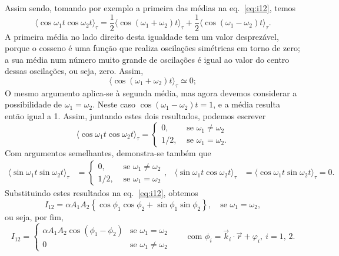 Assim sendo, tomando por exemplo a primeira das médias na eq.~\eqref{eq:i12},
temos
\begin{equation*}
\langle\cos\omega_1t\cos\omega_2t\rangle_\tau=
\frac{1}{2}\langle\cos(\omega_1+\omega_2)t\rangle_\tau+
\frac{1}{2}\langle\cos(\omega_1-\omega_2)t\rangle_\tau.
\end{equation*}
A primeira média no lado direito desta igualdade tem um valor desprezável,
porque o cosseno é uma função que realiza oscilações simétricas em torno de
zero; a sua média num número muito grande de oscilações é igual ao valor do
centro dessas oscilações, ou seja, zero. Assim,
\begin{equation*}
\langle\cos(\omega_1+\omega_2)t\rangle_\tau\simeq0;
\end{equation*}
O mesmo argumento aplica-se à segunda média, mas agora devemos considerar a
possibilidade de $\omega_1=\omega_2$. Neste caso $\cos(\omega_1-\omega_2)t=1$, e
a média resulta então igual a 1. Assim, juntando estes dois resultados, podemos
escrever
\begin{equation*}
\langle\cos\omega_1t\cos\omega_2t\rangle_\tau=
\begin{cases}
  0,&\text{ se }\omega_1\neq\omega_2\\
  1/2,&\text{ se }\omega_1=\omega_2.
\end{cases}
\end{equation*}
Com argumentos semelhantes, demonstra-se também que
\begin{align*}
\langle\sin\omega_1t\sin\omega_2t\rangle_\tau&=
\begin{cases}
  0,&\text{ se }\omega_1\neq\omega_2\\
  1/2,&\text{ se }\omega_1=\omega_2
\end{cases}, &
\langle\sin\omega_1t\cos\omega_2t\rangle_\tau&=
\langle\cos\omega_1t\sin\omega_2t\rangle_\tau=0.
\end{align*}
Substituindo estes resultados na eq.~\eqref{eq:i12}, obtemos
\begin{equation*}
I_{12}=\alpha A_1A_2\left\{\cos\phi_1\cos\phi_2+\sin\phi_1\sin\phi_2\right\},
\quad\text{se }\omega_1=\omega_2,
\end{equation*}
ou seja, por fim,
\begin{equation}\label{eq:interf1}
I_{12}=
\begin{cases}
\alpha A_1A_2\cos(\phi_1-\phi_2) & \text{se }\omega_1=\omega_2\\
0 & \text{se } \omega_1\neq\omega_2
\end{cases}
\qquad
\text{com }\phi_i=\vec k_i\cdot\vec r+\varphi_i,\ i=1,\,2.
\end{equation}

